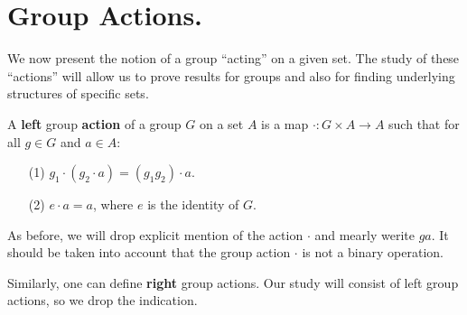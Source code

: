 \section{Group Actions.}
\label{section1}

We now present the notion of a group ``acting'' on a given set. The study of
these ``actions'' will allow us to prove results for groups and also for finding
underlying structures of specific sets.

\begin{definition}
    A \textbf{left} group \textbf{action} of a group $G$ on a set  $A$ is a map
    $\cdot: G \times A
    \rightarrow A$ such that for all $g \in G$ and  $a \in A$:
    \begin{enumerate}
        \item[(1)] $g_1 \cdot (g_2 \cdot a)=(g_1g_2) \cdot a$.

        \item[(2)] $e \cdot a=a$, where  $e$ is the identity of  $G$.
    \end{enumerate}
\end{definition}
\begin{remark}
    As before, we will drop explicit mention of the action $\cdot$ and mearly
    werite $ga$. It should be taken into account that the group action $\cdot$
    is not a binary operation.
\end{remark}
\begin{remark}
    Similarly, one can define \textbf{right} group actions. Our study will
    consist of left group actions, so we drop the indication.
\end{remark}

